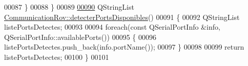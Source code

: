 \begin{DoxyCode}
00087     \}
00088 \}
00089 
\hyperlink{class_communication_rov_ad9882c08083c66cd89b472b9244727e9}{00090} QStringList \hyperlink{class_communication_rov_ad9882c08083c66cd89b472b9244727e9}{CommunicationRov::detecterPortsDisponibles}()
00091 \{
00092     QStringList listePortsDetectes;
00093 
00094     \textcolor{keywordflow}{foreach}(\textcolor{keyword}{const} QSerialPortInfo &info, QSerialPortInfo::availablePorts())
00095     \{
00096         listePortsDetectes.push\_back(info.portName());
00097     \}
00098 
00099     \textcolor{keywordflow}{return} listePortsDetectes;
00100 \}
00101 
\end{DoxyCode}

